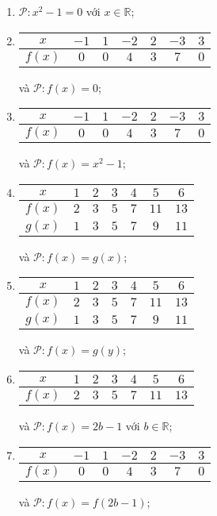 \documentclass[a4paper, titlepage, openany]{book}
\begin{document}
\begin{enumerate}
   \item $\mathcal{P}: x^2 - 1 = 0$ với $x \in \mathbb{R}$;
   \item
   \begin{tabular}{|c|c|c|c|c|c|c|}
      \hline
      $x$ & $-1$ & $1$ & $-2$ & $2$ & $-3$ & $3$\\
      \hline
      $f(x)$ & $0$ & $0$ & $4$ & $3$ & $7$ & $0$\\
      \hline
   \end{tabular} và $\mathcal{P}: f(x) = 0$;

   \item
   \begin{tabular}{|c|c|c|c|c|c|c|}
      \hline
      $x$ & $-1$ & $1$ & $-2$ & $2$ & $-3$ & $3$\\
      \hline
      $f(x)$ & $0$ & $0$ & $4$ & $3$ & $7$ & $0$\\
      \hline
   \end{tabular} và $\mathcal{P}: f(x) = x^2 - 1$;

   \item
   \begin{tabular}{|c|c|c|c|c|c|c|}
      \hline
      $x$ & $1$ & $2$ & $3$ & $4$ & $5$ & $6$\\
      \hline
      $f(x)$ & $2$ & $3$ & $5$ & $7$ & $11$ & $13$\\
      \hline
      $g(x)$ & $1$ & $3$ & $5$ & $7$ & $9$ & $11$\\
      \hline
   \end{tabular} và $\mathcal{P}: f(x) = g(x)$;

   \item
   \begin{tabular}{|c|c|c|c|c|c|c|}
      \hline
      $x$ & $1$ & $2$ & $3$ & $4$ & $5$ & $6$\\
      \hline
      $f(x)$ & $2$ & $3$ & $5$ & $7$ & $11$ & $13$\\
      \hline
      $g(x)$ & $1$ & $3$ & $5$ & $7$ & $9$ & $11$\\
      \hline
   \end{tabular} và $\mathcal{P}: f(x) = g(y)$;

   \item
   \begin{tabular}{|c|c|c|c|c|c|c|}
      \hline
      $x$ & $1$ & $2$ & $3$ & $4$ & $5$ & $6$\\
      \hline
      $f(x)$ & $2$ & $3$ & $5$ & $7$ & $11$ & $13$\\
      \hline
   \end{tabular} và $\mathcal{P}: f(x) = 2b-1$ với $b \in \mathbb{R}$;

   \item
   \begin{tabular}{|c|c|c|c|c|c|c|}
      \hline
      $x$ & $-1$ & $1$ & $-2$ & $2$ & $-3$ & $3$\\
      \hline
      $f(x)$ & $0$ & $0$ & $4$ & $3$ & $7$ & $0$\\
      \hline
   \end{tabular} và $\mathcal{P}: f(x) = f(2b - 1)$;
\end{enumerate}
\end{document}
